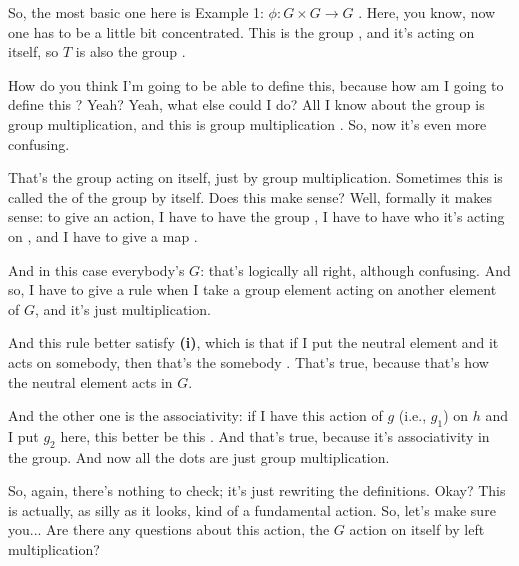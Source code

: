 \begin{speech}[01:03:35 - 01:05:38]
So, the most basic one here is Example 1: $\phi \colon G \times G \to G$ . Here, you know, now one has to be a little bit concentrated. This is the group , and it's acting on itself, so $T$ is also the group .

How do you think I'm going to be able to define this, because how am I going to define this ? Yeah?  Yeah, what else could I do? All I know about the group is group multiplication, and this is group multiplication . So, now it's even more confusing.

That's the group acting on itself, just by group multiplication. Sometimes this is called the  of the group by itself. Does this make sense? Well, formally it makes sense: to give an action, I have to have the group , I have to have who it's acting on , and I have to give a map .

And in this case everybody's $G$: that's logically all right, although confusing. And so, I have to give a rule when I take a group element acting on another element of $G$, and it's just multiplication.

And this rule better satisfy \textbf{(i)}, which is that if I put the neutral element and it acts on somebody, then that's the somebody . That's true, because that's how the neutral element acts in $G$.

And the other one is the associativity: if I have this action of $g$ (i.e., $g_1$) on $h$ and I put $g_2$ here, this better be this . And that's true, because it's associativity in the group. And now all the dots are just group multiplication.

So, again, there's nothing to check; it's just rewriting the definitions. Okay? This is actually, as silly as it looks, kind of a fundamental action. So, let's make sure you... Are there any questions about this action, the $G$ action on itself by left multiplication?
\end{speech}

